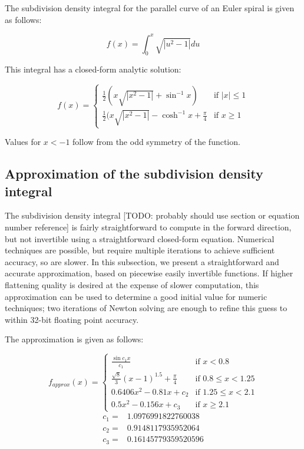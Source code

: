 \documentclass[format=acmsmall]{acmart}
\begin{document}
The subdivision density integral for the parallel curve of an Euler spiral is given as follows:

\[
    f(x) = \int_0^x\sqrt{|u^2 - 1|} du
\]

This integral has a closed-form analytic solution:

\[
    f(x) = \left\{
        \begin{array}{rl}
            \frac{1}{2}(x\sqrt{|x^2-1|} + \sin^{-1}x) & \text{if } |x| \leq 1 \\
            \frac{1}{2}(x\sqrt{|x^2-1|} - \cosh^{-1}x + \frac{\pi}{4} & \text{if } x \geq 1
        \end{array}
    \right.
\]

Values for $x<-1$ follow from the odd symmetry of the function. 


\subsection{Approximation of the subdivision density integral}

The subdivision density integral [TODO: probably should use section or equation number reference] is fairly straightforward to compute in the forward direction, but not invertible using a straightforward closed-form equation. Numerical techniques are possible, but require multiple iterations to achieve sufficient accuracy, so are slower. In this subsection, we present a straightforward and accurate approximation, based on piecewise easily invertible functions. If higher flattening quality is desired at the expense of slower computation, this approximation can be used to determine a good initial value for numeric techniques; two iterations of Newton solving are enough to refine this guess to within 32-bit floating point accuracy.

The approximation is given as follows:

\[ 
    f_\mathit{approx}(x) = \left\{
        \begin{array}{rl}
            \frac{\sin c_1 x}{c_1} & \text{if } x < 0.8 \\
            \frac{\sqrt{8}}{3}(x-1)^{1.5} + \frac{\pi}{4} & \text{if } 0.8 \leq x < 1.25 \\
            0.6406x^2 - 0.81x + c_2 & \text{if } 1.25 \leq x < 2.1 \\
            0.5x^2 - 0.156x + c_3 & \text{if } x \geq 2.1
        \end{array}
        \right.
\]
\[
    \begin{array}{ll}
        c_1 = & 1.0976991822760038 \\
        c_2 = & 0.9148117935952064 \\
        c_3 = & 0.16145779359520596
    \end{array}
\]
\end{document}

